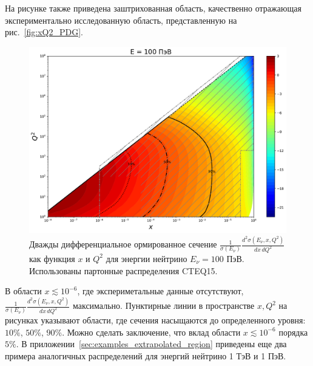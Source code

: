 На рисунке также приведена заштрихованная область, качественно отражающая экспериментально исследованную область, представленную на рис.~\ref{fig:xQ2_PDG}.
\begin{figure}[!h]
\centering
\includegraphics[width=0.8\linewidth]{images/NuProp/cdfxq2_cc_proton_CT18ZNNLO_14_100000000.pdf}
\caption{Дважды дифференциальное ормированное сечение $\frac{1}{\sigma(E_\nu)}\frac{d^2\sigma(E_\nu,x,Q^2)}{dx\,dQ^2}$ как функция $x$ и $Q^2$ для энергии нейтрино $E_{\nu} = 100$ ПэВ. Использованы партонные распределения CTEQ15\cite{ncteq15}.}
\label{fig:diff_xsec_100PeV}
\end{figure}

В области $x\lesssim 10^{-6}$, где экспериметальные данные отсутствуют, $\frac{1}{\sigma(E_\nu)}\frac{d^2\sigma(E_\nu,x,Q^2)}{dx\,dQ^2}$ максимально.  Пунктирные линии в пространстве $x,Q^2$ на рисунках указывают области, где сечения насыщаются до определенного уровня: $10\%$, $50\%$, $90\%$. Можно сделать заключение, что вклад области $x\lesssim 10^{-6}$ порядка $5\%$. В приложении~\ref{sec:examples_extrapolated_region} приведены еще два примера аналогичных распределений для энергий нейтрино 1 ТэВ и 1 ПэВ. 

